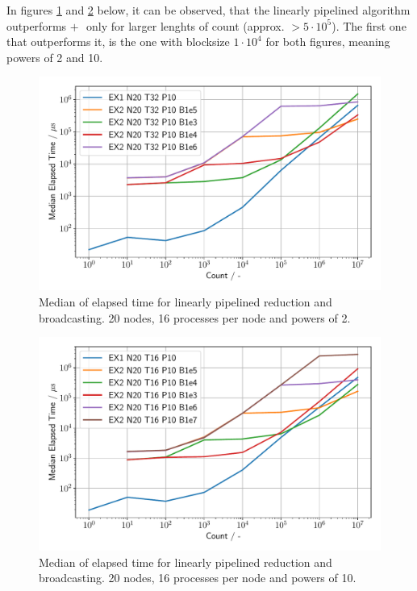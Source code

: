 \pagebreak
In figures \ref{Ex2_1_p} and \ref{Ex2_2_p} below, it can be observed, that the linearly pipelined algorithm outperforms
\MPIRD  $+$ \MPIBC  $ $ only for larger lenghts of count (approx. $> 5 \cdot 10^{5}$). The first one that 
outperforms it, is the one with blocksize $1 \cdot 10^4$ for both figures, meaning powers of 2 and 10. 

\begin{figure}[h]
    \begin{center}
        \includegraphics[width=0.7\linewidth]{figures/Ex2_1.pdf}
        \caption{Median of elapsed time for linearly pipelined reduction and broadcasting. 
        20 nodes, 16 processes per node and powers of 2.}
        \label{Ex2_1_p}
    \end{center}
\end{figure}
 
\null

\begin{figure}[h]
    \begin{center}
        \includegraphics[width=0.7\linewidth]{figures/Ex2_2.pdf}
        \caption{Median of elapsed time for linearly pipelined reduction and broadcasting. 
        20 nodes, 16 processes per node and powers of 10.}
        \label{Ex2_2_p}
    \end{center}
\end{figure}



